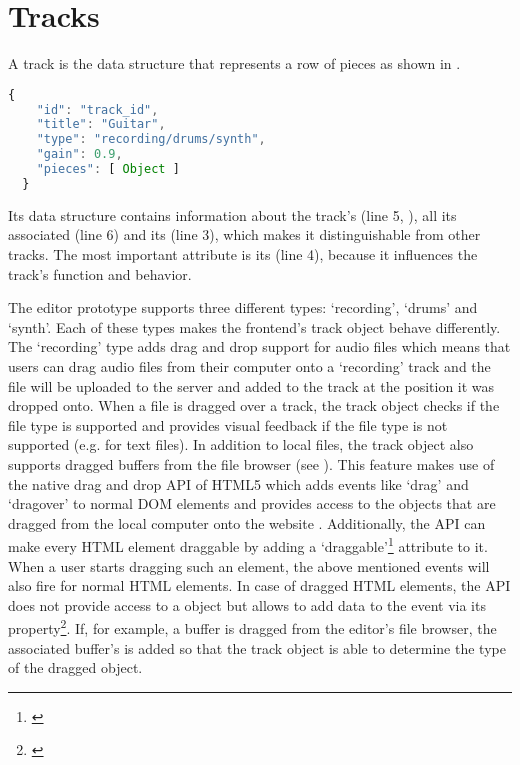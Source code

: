 \section{Tracks}
\label{impl-tracks}

A track is the data structure that represents a row of pieces as shown in .

\begin{lstlisting}[language=JavaScript, caption=A track's data structure, label=lst:track-structure]
  {
    "id": "track_id",
    "title": "Guitar",
    "type": "recording/drums/synth",
    "gain": 0.9,
    "pieces": [ Object ]
  }
\end{lstlisting}

Its data structure contains information about the track's  (line 5, ), all its associated  (line 6) and its  (line 3), which makes it distinguishable from other tracks. The most important attribute is its  (line 4), because it influences the track's function and behavior. 

The editor prototype supports three different types: `recording', `drums' and `synth'. Each of these types makes the frontend's track object behave differently. The `recording' type adds drag and drop support for audio files which means that users can drag audio files from their computer onto a `recording' track and the file will be uploaded to the server and added to the track at the position it was dropped onto. When a file is dragged over a track, the track object checks if the file type is supported and provides visual feedback if the file type is not supported (e.g. for text files). In addition to local files, the track object also supports dragged buffers from the file browser (see ). This feature makes use of the native drag and drop API of HTML5 which adds events like `drag' and `dragover' to normal DOM elements and provides access to the  objects that are dragged from the local computer onto the website \cite{bidelman2010dnd}. Additionally, the API can make every HTML element draggable by adding a `draggable'\footnote{\cite[chapter: Creating draggable content]{bidelman2010dnd}} attribute to it. When a user starts dragging such an element, the above mentioned events will also fire for normal HTML elements. In case of dragged HTML elements, the API does not provide access to a  object but allows to add data to the event via its  property\footnote{\cite[chapter: The DataTransfer object]{bidelman2010dnd}}. If, for example, a buffer is dragged from the editor's file browser, the associated buffer's  is added so that the track object is able to determine the type of the dragged object.

